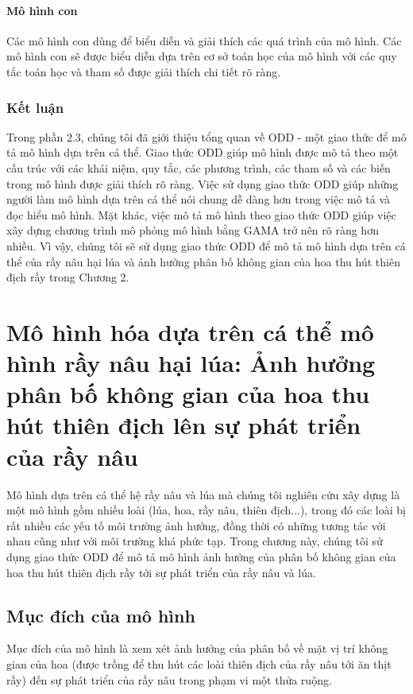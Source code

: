 \documentclass[13pt]{extreport}
\begin{document}
\subsubsection{Mô hình con}
Các mô hình con dùng để biểu diễn và giải thích các quá trình của mô hình. Các mô hình con sẽ được biểu diễn dựa trên cơ sở toán học của mô hình với các quy tắc toán học và tham số được giải thích chi tiết rõ ràng.

\subsection{Kết luận}
Trong phần 2.3, chúng tôi đã giới thiệu tổng quan về ODD - một giao thức để mô tả mô hình dựa trên cá thể. Giao thức ODD giúp mô hình được mô tả theo một cấu trúc với các khái niệm, quy tắc, các phương trình, các tham số và các biến trong mô hình được giải thích rõ ràng. Việc sử dụng giao thức ODD giúp những người làm mô hình dựa trên cá thể nói chung dễ dàng hơn trong việc mô tả và đọc hiểu mô hình. Mặt khác, việc mô tả mô hình theo giao thức ODD giúp việc xây dựng chương trình mô phỏng mô hình bằng GAMA trở nên rõ ràng hơn nhiều. Vì vậy, chúng tôi sẽ sử dụng giao thức ODD để mô tả mô hình dựa trên cá thể của rầy nâu hại lúa và ảnh hưởng phân bố không gian của hoa thu hút thiên địch rầy trong Chương 2.
\newpage

\chapter{Mô hình hóa dựa trên cá thể mô hình rầy nâu hại lúa: Ảnh hưởng phân bố không gian của hoa thu hút thiên địch lên sự phát triển của rầy nâu}
\indent Mô hình dựa trên cá thể hệ rầy nâu và lúa mà chúng tôi nghiên cứu xây dựng là một mô hình gồm nhiều loài (lúa, hoa, rầy nâu, thiên địch...), trong đó các loài bị rất nhiều các yếu tố môi trường ảnh hưởng, đồng thời có những tương tác với nhau cũng như với môi trường khá phức tạp. Trong chương này, chúng tôi sử dụng giao thức ODD để mô tả mô hình ảnh hưởng của phân bố không gian của hoa thu hút thiên địch rầy tới sự phát triển của rầy nâu và lúa.

\section{Mục đích của mô hình}
Mục đích của mô hình là xem xét ảnh hưởng của phân bố về mặt vị trí không gian của hoa (được trồng để thu hút các loài thiên địch của rầy nâu tới ăn thịt rầy) đến sự phát triển của rầy nâu trong phạm vi một thửa ruộng.
\end{document}
